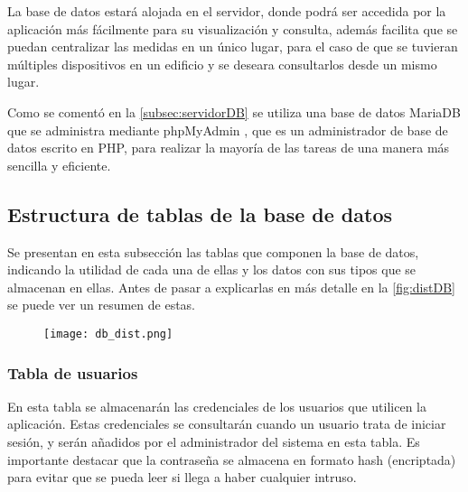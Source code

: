 La base de datos estará alojada en el servidor, donde podrá ser accedida por la aplicación más fácilmente para su visualización y consulta, además facilita que se puedan centralizar las medidas en un único lugar, para el caso de que se tuvieran múltiples dispositivos en un edificio y se deseara consultarlos desde un mismo lugar.

Como se comentó en la \autoref{subsec:servidorDB} se utiliza una base de datos MariaDB que se administra mediante phpMyAdmin \cite{noauthor_phpmyadmin_nodate}, que es un administrador de base de datos escrito en PHP, para realizar la mayoría de las tareas de una manera más sencilla y eficiente.

\subsection{Estructura de tablas de la base de datos}
Se presentan en esta subsección las tablas que componen la base de datos, indicando la utilidad de cada una de ellas y los datos con sus tipos que se almacenan en ellas. Antes de pasar a explicarlas en más detalle en la \autoref{fig:distDB} se puede ver un resumen de estas.
\begin{figure}[H]
	{\texttt{[image: db\_dist.png]}}
\end{figure}
\subsubsection{Tabla de usuarios}
En esta tabla se almacenarán las credenciales de los usuarios que utilicen la aplicación. Estas credenciales se consultarán cuando un usuario trata de iniciar sesión, y serán añadidos por el administrador del sistema en esta tabla. Es importante destacar que la contraseña se almacena en formato hash (encriptada) para evitar que se pueda leer si llega a haber cualquier intruso. 
\pagebreak

